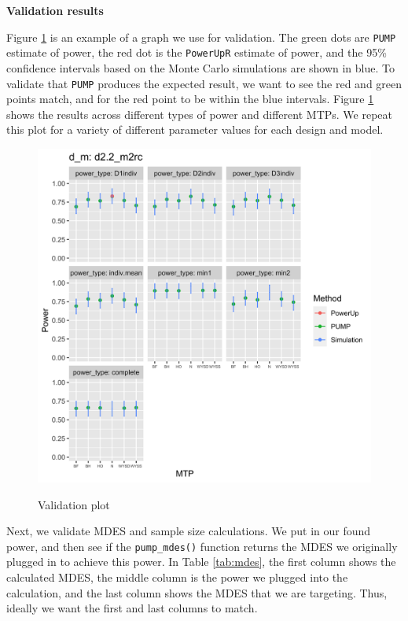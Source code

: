 \documentclass[
]{article}
\begin{document}
\textbf{Validation results}

Figure \ref{fig:validate} is an example of a graph we use for
validation. The green dots are \texttt{PUMP} estimate of power, the red
dot is the \texttt{PowerUpR} estimate of power, and the 95\% confidence
intervals based on the Monte Carlo simulations are shown in blue. To
validate that \texttt{PUMP} produces the expected result, we want to see
the red and green points match, and for the red point to be within the
blue intervals. Figure \ref{fig:validate} shows the results across
different types of power and different MTPs. We repeat this plot for a
variety of different parameter values for each design and model.

\begin{figure}[h!]
\centering
  \includegraphics[width=6in]{example_validation_plot.png}
  \label{fig:validate}
  \caption{Validation plot}
\end{figure}

Next, we validate MDES and sample size calculations. We put in our found
power, and then see if the \texttt{pump\_mdes()} function returns the
MDES we originally plugged in to achieve this power. In Table
\ref{tab:mdes}, the first column shows the calculated MDES, the middle
column is the power we plugged into the calculation, and the last column
shows the MDES that we are targeting. Thus, ideally we want the first
and last columns to match.
\end{document}
